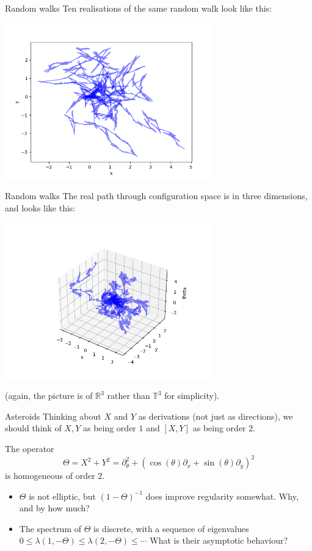 \documentclass{beamer}
\numberwithin{equation}{section}
\theoremstyle{plain}
\theoremstyle{plain}
\theoremstyle{definition}
\theoremstyle{plain}
\theoremstyle{plain}
\theoremstyle{definition}
\newcommand{\Rl}{\mathbb{R}}
\newcommand{\Circ}{\mathbb{T}}
\begin{document}
\begin{frame}{Random walks}
  Ten realisations of the same random walk look like this:
  \begin{center}
    \includegraphics[width=90mm]{xy_coords_multiple_paths.png}
  \end{center}
\end{frame}

\begin{frame}{Random walks}
  The real path through configuration space is in three dimensions, and looks like this:
  \begin{center}
  \includegraphics[width=90mm]{xyt_coords_multiple_paths.png}
  \end{center}
  (again, the picture is of $\Rl^3$ rather than $\Circ^3$ for simplicity).
\end{frame}



\begin{frame}{Asteroids}
  Thinking about $X$ and $Y$ as derivations (not just as directions), we should think of $X,Y$ as being order $1$ and $[X,Y]$ as being order $2.$

  The operator
  \[
    \Theta = X^2+Y^2 = \partial_\theta^2+(\cos(\theta)\partial_x+\sin(\theta)\partial_y)^2
  \]
  is homogeneous of order $2.$
  \pause
  \begin{itemize}
    \item{} $\Theta$ is not elliptic, but $(1-\Theta)^{-1}$ does improve regularity somewhat. Why, and by how much?
    \item{} The spectrum of $\Theta$ is discrete, with a sequence of eigenvalues $0\leq \lambda(1,-\Theta) \leq \lambda(2,-\Theta) \leq \cdots$ What is their asymptotic behaviour?
  \end{itemize}
\end{frame}
\end{document}
